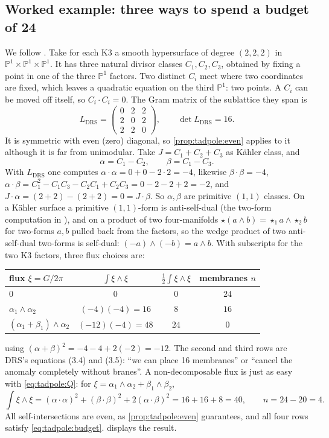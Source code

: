 \subsection{Worked example: three ways to spend a budget of 24}\label{sec:tadpole:worked}
We follow . Take for each K3 a smooth
hypersurface of degree $(2,2,2)$ in $\mathbb P^1\times\mathbb P^1\times\mathbb P^1$. It has
three natural divisor classes $C_1,C_2,C_3$, obtained by fixing a point in one of the three
$\mathbb P^1$ factors. Two distinct $C_i$ meet where two coordinates are fixed, which leaves
a quadratic equation on the third $\mathbb P^1$: two points. A $C_i$ can be moved off itself,
so $C_i\cdot C_i=0$. The Gram matrix of the sublattice they span is
\begin{equation}\label{eq:tadpole:drsgram}
 L_{\mathrm{DRS}}=\begin{pmatrix}0&2&2\\2&0&2\\2&2&0\end{pmatrix},\qquad\det L_{\mathrm{DRS}}=16 .
\end{equation}
It is symmetric with even (zero) diagonal, so \cref{prop:tadpole:even} applies to it although
it is far from unimodular. Take $J=C_1+C_2+C_3$ as K\"ahler class, and
\[
 \alpha=C_1-C_2,\qquad\beta=C_1-C_3 .
\]
With $L_{\mathrm{DRS}}$ one computes
$\alpha\cdot\alpha=0+0-2\cdot2=-4$, likewise $\beta\cdot\beta=-4$,
$\alpha\cdot\beta=C_1^2-C_1C_3-C_2C_1+C_2C_3=0-2-2+2=-2$, and
$J\cdot\alpha=(2+2)-(2+2)=0=J\cdot\beta$. So $\alpha,\beta$ are primitive $(1,1)$ classes.
On a K\"ahler surface a primitive $(1,1)$-form is anti-self-dual (the two-form computation in
), and on a product of two four-manifolds $\star(a\wedge b)=\star_1a\wedge\star_2b$ for
two-forms $a,b$ pulled back from the factors, so the wedge product of two anti-self-dual
two-forms is self-dual: $(-a)\wedge(-b)=a\wedge b$. With subscripts for the
two K3 factors, three flux choices are:
\begin{center}
\begin{tabular}{@{}lccc@{}}
\toprule
flux $\xi=G/2\pi$ & $\int\xi\wedge\xi$ & $\tfrac12\int\xi\wedge\xi$ & membranes $n$\\
\midrule
$0$ & $0$ & $0$ & $24$\\
$\alpha_1\wedge\alpha_2$ & $(-4)(-4)=16$ & $8$ & $16$\\
$(\alpha_1+\beta_1)\wedge\alpha_2$ & $(-12)(-4)=48$ & $24$ & $0$\\
\bottomrule
\end{tabular}
\end{center}
using $(\alpha+\beta)^2=-4-4+2(-2)=-12$. The second and third rows are DRS's equations (3.4)
and (3.5): ``we can place 16 membranes'' or ``cancel the anomaly completely without branes''.
A non-decomposable flux is just as easy with \eqref{eq:tadpole:Q}: for
$\xi=\alpha_1\wedge\alpha_2+\beta_1\wedge\beta_2$,
\[
 \int\xi\wedge\xi=(\alpha\cdot\alpha)^2+(\beta\cdot\beta)^2+2(\alpha\cdot\beta)^2=16+16+8=40,
 \qquad n=24-20=4 .
\]
All self-intersections are even, as \cref{prop:tadpole:even} guarantees, and all four rows
satisfy \eqref{eq:tadpole:budget}.  displays the result.

